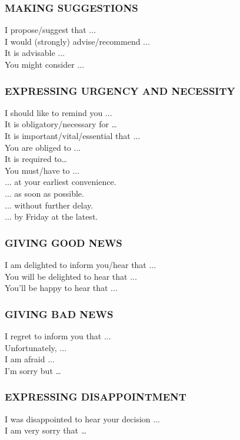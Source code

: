 \subsubsection{MAKING SUGGESTIONS}
I propose/suggest that ...\\
I would (strongly) advise/recommend ...\\
It is advisable ...\\
You might consider ...\\
\subsubsection{EXPRESSING URGENCY AND NECESSITY}
I should like to remind you ...\\
It is obligatory/necessary for …\\
It is important/vital/essential that ...\\
You are obliged to ...\\
It is required to…\\
You must/have to ...\\
... at your earliest convenience.\\
... as soon as possible.\\
... without further delay.\\
... by Friday at the latest.\\
\subsubsection{GIVING GOOD NEWS}
I am delighted to inform you/hear that ...\\
You will be delighted to hear that ...\\
You’ll be happy to hear that ...\\
\subsubsection{GIVING BAD NEWS}
I regret to inform you that ...\\
Unfortunately, ...\\
I am afraid ...\\
I’m sorry but …\\
\subsubsection{EXPRESSING DISAPPOINTMENT}
I was disappointed to hear your decision ...\\
I am very sorry that …\\
